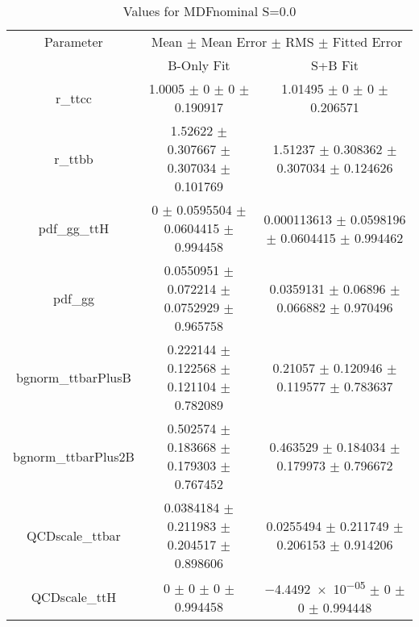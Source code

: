 \begin{table}
\centering
\caption{Values for MDFnominal S=0.0}
\begin{tabular}{ccc}
\toprule
Parameter & \multicolumn{2}{c}{Mean $\pm$ Mean Error $\pm$ RMS $\pm$ Fitted Error}\\
 & B-Only Fit & S+B Fit\\
\midrule
r\_ttcc & \num{1.0005} $\pm$ \num{0} $\pm$ \num{0} $\pm$ \num{0.190917} & \num{1.01495} $\pm$ \num{0} $\pm$ \num{0} $\pm$ \num{0.206571}\\
r\_ttbb & \num{1.52622} $\pm$ \num{0.307667} $\pm$ \num{0.307034} $\pm$ \num{0.101769} & \num{1.51237} $\pm$ \num{0.308362} $\pm$ \num{0.307034} $\pm$ \num{0.124626}\\
pdf\_gg\_ttH & \num{0} $\pm$ \num{0.0595504} $\pm$ \num{0.0604415} $\pm$ \num{0.994458} & \num{0.000113613} $\pm$ \num{0.0598196} $\pm$ \num{0.0604415} $\pm$ \num{0.994462}\\
pdf\_gg & \num{0.0550951} $\pm$ \num{0.072214} $\pm$ \num{0.0752929} $\pm$ \num{0.965758} & \num{0.0359131} $\pm$ \num{0.06896} $\pm$ \num{0.066882} $\pm$ \num{0.970496}\\
bgnorm\_ttbarPlusB & \num{0.222144} $\pm$ \num{0.122568} $\pm$ \num{0.121104} $\pm$ \num{0.782089} & \num{0.21057} $\pm$ \num{0.120946} $\pm$ \num{0.119577} $\pm$ \num{0.783637}\\
bgnorm\_ttbarPlus2B & \num{0.502574} $\pm$ \num{0.183668} $\pm$ \num{0.179303} $\pm$ \num{0.767452} & \num{0.463529} $\pm$ \num{0.184034} $\pm$ \num{0.179973} $\pm$ \num{0.796672}\\
QCDscale\_ttbar & \num{0.0384184} $\pm$ \num{0.211983} $\pm$ \num{0.204517} $\pm$ \num{0.898606} & \num{0.0255494} $\pm$ \num{0.211749} $\pm$ \num{0.206153} $\pm$ \num{0.914206}\\
QCDscale\_ttH & \num{0} $\pm$ \num{0} $\pm$ \num{0} $\pm$ \num{0.994458} & \num{-4.4492e-05} $\pm$ \num{0} $\pm$ \num{0} $\pm$ \num{0.994448}\\
\bottomrule
\end{tabular}
\end{table}